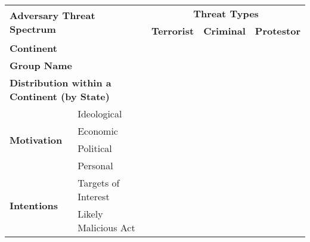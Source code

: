 \documentclass[a4paper]{article}
\begin{document}
\begin{table}[h!]
\centering
\begin{tabular}{|l|l|l|l|l|l|}
\hline
\multicolumn{3}{|l|}{\multirow{2}{*}{\textbf{Adversary Threat Spectrum}}}                             			& \multicolumn{3}{c|}{\textbf{Threat Types}}                        \\ \cline{4-6} 
\multicolumn{3}{|l|}{}                                                                                						& \textbf{Terrorist} & \textbf{Criminal} & \textbf{Protestor}   \\ \hline
\multicolumn{3}{|l|}{\textbf{Continent}}                                                              					& \multicolumn{3}{l|}{}                                         		       	\\ \hline
\multicolumn{3}{|l|}{\textbf{Group Name}}                                                             					& \multicolumn{3}{l|}{}                                       		       	\\ \hline
\multicolumn{3}{|l|}{\textbf{Distribution within a Continent (by State)}}                             			& \multicolumn{3}{l|}{}                                       		       	\\ \hline
\multirow{4}{*}{\textbf{Motivation}}              	& \multicolumn{2}{l|}{Ideological}                  		&                    &                   &                    			       	\\ \cline{2-6} 
                                                				& \multicolumn{2}{l|}{Economic}                     		&                    &                   &                    				\\ \cline{2-6} 
                                                		  		& \multicolumn{2}{l|}{Political}                    			&                    &                   &                    				\\ \cline{2-6} 
                                                  				& \multicolumn{2}{l|}{Personal}                     		&                    &                   &                    				\\ \hline
\multirow{3}{*}{\textbf{Intentions}}              		& \multicolumn{2}{l|}{Targets of Interest}          		&                    &                   &                    				\\ \cline{2-6} 
                                                 		        		& \multicolumn{2}{l|}{Likely Malicious Act}         		&                    &                   &                    				\\ \cline{2-6} 

\end{tabular}
\end{table}
\end{document}
